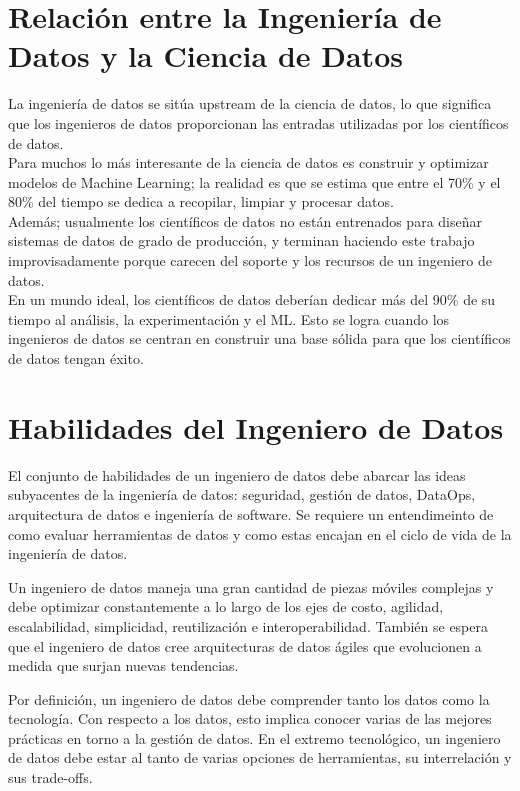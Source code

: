 \documentclass[12pt]{book}
\begin{document}
\section{Relación entre la Ingeniería de Datos y la Ciencia de Datos}
La ingeniería de datos se sitúa upstream de la ciencia de datos, lo que significa que los ingenieros de datos proporcionan las entradas utilizadas por los científicos de datos.\\
Para muchos lo más interesante de la ciencia de datos es construir y optimizar modelos de Machine Learning; la realidad es que se estima que entre el 70\% y el 80\% del tiempo se dedica a recopilar, limpiar y procesar datos.\\
Además; usualmente los científicos de datos no están entrenados para diseñar sistemas de datos de grado de producción, y terminan haciendo este trabajo improvisadamente porque carecen del soporte y los recursos de un ingeniero de datos.\\
En un mundo ideal, los científicos de datos deberían dedicar más del 90\% de su tiempo al análisis, la experimentación y el ML. Esto se logra cuando los ingenieros de datos se centran en construir una base sólida para que los científicos de datos tengan éxito.

\section{Habilidades del Ingeniero de Datos}
El conjunto de habilidades de un ingeniero de datos debe abarcar las ideas subyacentes de la ingeniería de datos: seguridad, gestión de datos, DataOps, arquitectura de datos e ingeniería de software. Se requiere un entendimeinto de como evaluar herramientas de datos y como estas encajan en el ciclo de vida de la ingeniería de datos. 

Un ingeniero de datos maneja una gran cantidad de piezas móviles complejas y debe optimizar constantemente a lo largo de los ejes de costo, agilidad, escalabilidad, simplicidad, reutilización e interoperabilidad. También se espera que el ingeniero de datos cree arquitecturas de datos ágiles que evolucionen a medida que surjan nuevas tendencias.

Por definición, un ingeniero de datos debe comprender tanto los datos como la tecnología. Con respecto a los datos, esto implica conocer varias de las mejores prácticas en torno a la gestión de datos. En el extremo tecnológico, un ingeniero de datos debe estar al tanto de varias opciones de herramientas, su interrelación y sus trade-offs.
\end{document}

